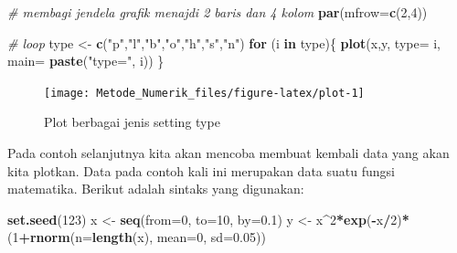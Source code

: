 \documentclass[]{book}
\newenvironment{Shaded}{\begin{snugshade}}{\end{snugshade}}
\newcommand{\CommentTok}[1]{\textcolor[rgb]{0.56,0.35,0.01}{\textit{#1}}}
\newcommand{\ControlFlowTok}[1]{\textcolor[rgb]{0.13,0.29,0.53}{\textbf{#1}}}
\newcommand{\DataTypeTok}[1]{\textcolor[rgb]{0.13,0.29,0.53}{#1}}
\newcommand{\DecValTok}[1]{\textcolor[rgb]{0.00,0.00,0.81}{#1}}
\newcommand{\FloatTok}[1]{\textcolor[rgb]{0.00,0.00,0.81}{#1}}
\newcommand{\KeywordTok}[1]{\textcolor[rgb]{0.13,0.29,0.53}{\textbf{#1}}}
\newcommand{\NormalTok}[1]{#1}
\newcommand{\OperatorTok}[1]{\textcolor[rgb]{0.81,0.36,0.00}{\textbf{#1}}}
\newcommand{\StringTok}[1]{\textcolor[rgb]{0.31,0.60,0.02}{#1}}
\theoremstyle{definition}
\theoremstyle{definition}
\theoremstyle{definition}
\theoremstyle{remark}
\begin{document}
\begin{Shaded}
\begin{Highlighting}[]
\CommentTok{# membagi jendela grafik menajdi 2 baris dan 4 kolom}
\KeywordTok{par}\NormalTok{(}\DataTypeTok{mfrow=}\KeywordTok{c}\NormalTok{(}\DecValTok{2}\NormalTok{,}\DecValTok{4}\NormalTok{))}

\CommentTok{# loop}
\NormalTok{type <-}\StringTok{ }\KeywordTok{c}\NormalTok{(}\StringTok{"p"}\NormalTok{,}\StringTok{"l"}\NormalTok{,}\StringTok{"b"}\NormalTok{,}\StringTok{"o"}\NormalTok{,}\StringTok{"h"}\NormalTok{,}\StringTok{"s"}\NormalTok{,}\StringTok{"n"}\NormalTok{)}
\ControlFlowTok{for}\NormalTok{ (i }\ControlFlowTok{in}\NormalTok{ type)\{}
  \KeywordTok{plot}\NormalTok{(x,y, }\DataTypeTok{type=}\NormalTok{ i,}
       \DataTypeTok{main=} \KeywordTok{paste}\NormalTok{(}\StringTok{"type="}\NormalTok{, i))}
\NormalTok{\}}
\end{Highlighting}
\end{Shaded}

\begin{figure}

{\centering \texttt{[image: Metode\_Numerik\_files/figure-latex/plot-1]} 

}

\caption{Plot berbagai jenis setting type}\label{fig:plot}
\end{figure}

Pada contoh selanjutnya kita akan mencoba membuat kembali data yang akan kita plotkan. Data pada contoh kali ini merupakan data suatu fungsi matematika. Berikut adalah sintaks yang digunakan:

\begin{Shaded}
\begin{Highlighting}[]
\KeywordTok{set.seed}\NormalTok{(}\DecValTok{123}\NormalTok{)}
\NormalTok{x <-}\StringTok{ }\KeywordTok{seq}\NormalTok{(}\DataTypeTok{from=}\DecValTok{0}\NormalTok{, }\DataTypeTok{to=}\DecValTok{10}\NormalTok{, }\DataTypeTok{by=}\FloatTok{0.1}\NormalTok{)}
\NormalTok{y <-}\StringTok{ }\NormalTok{x}\OperatorTok{^}\DecValTok{2}\OperatorTok{*}\KeywordTok{exp}\NormalTok{(}\OperatorTok{-}\NormalTok{x}\OperatorTok{/}\DecValTok{2}\NormalTok{)}\OperatorTok{*}\NormalTok{(}\DecValTok{1}\OperatorTok{+}\KeywordTok{rnorm}\NormalTok{(}\DataTypeTok{n=}\KeywordTok{length}\NormalTok{(x), }\DataTypeTok{mean=}\DecValTok{0}\NormalTok{, }\DataTypeTok{sd=}\FloatTok{0.05}\NormalTok{))}
\end{Highlighting}
\end{Shaded}
\end{document}
